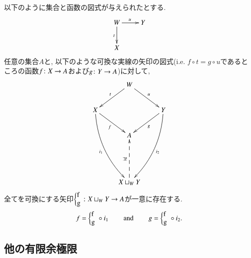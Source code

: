 \begin{lemma}[押し出しの普遍的性質]\label{lemma:up for po}

以下のように集合と函数の図式が与えられたとする.
\begin{align*}
\xymatrix{W\ar[r]^u\ar[d]_t&Y\\
X}
\end{align*}
任意の集合$A$と, 以下のような可換な実線の矢印の図式(i.e. $f\circ t=g\circ u$であるところの函数$f\colon X\rightarrow A$および$g\colon Y\rightarrow A$)に対して, 
\begin{align}\label{dia:universal property of po}
\xymatrix{
&W\ar[dr]^u\ar[dl]_t\\
X\ar@/_1pc/[dddr]_{i_1}\ar[rd]_f&&Y\ar@/^1pc/[dddl]^{i_2}\ar[dl]^g\\
&A\\\\
&X\sqcup_WY\ar@{-->}[uu]^{\exists!}
}
\end{align}
全てを可換にする矢印$\po{f}{g}{W}\taking X\sqcup_WY\to A$が一意に存在する.
$$f=\po{f}{g}{W}\circ i_1\hsp\text{and}\hsp g=\po{f}{g}{W}\circ i_2.$$
\end{lemma}


\subsection{他の有限余極限}

